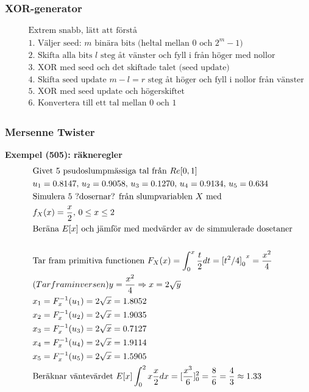\subsubsection{XOR-generator}
\begin{align*}
  &\quad  \text{Extrem snabb, lätt att förstå} \\
  &\quad  \text{1. Väljer seed: $m$ binära bits (heltal mellan $0$ och $2^m-1$)} \\
  &\quad  \text{2. Skifta alla bits $l$ steg åt vänster och fyll i från höger med nollor} \\
  &\quad  \text{3. XOR med seed och det skiftade talet (seed update)} \\
  &\quad  \text{4. Skifta seed update $m-l=r$ steg åt höger och fyll i nollor från vänster} \\
  &\quad  \text{5. XOR med seed update och högerskiftet} \\
  &\quad  \text{6. Konvertera till ett tal mellan $0$ och $1$} \\
\end{align*}

\subsubsection{Mersenne Twister}
\noindent\textbf{Exempel (505): räkneregler}
\begin{align*}
  &\quad  \text{Givet $5$ psudoslumpmässiga tal från $Re[0,1]$} \\
  &\quad  u_1=0.8147, \, u_2=0.9058, \, u_3=0.1270, \, u_4=0.9134, \, u_5=0.634 \\
  &\quad  \text{Simulera $5$ ?dosernar? från slumpvariablen $X$ med }\\
  &\quad  f_X(x)=\frac{x}{2}, \, 0 \leq x \leq 2 \\
  &\quad  \text{Beräna $E[x]$ och jämför med medvärder av de simmulerade dosetaner}\\
  &\quad  \\
  &\quad  \text{Tar fram primitiva functionen } F_X(x)=\int_0^x \frac{t}{2}dt = {{[t^2/4]}_0}^x=\frac{x^2}{4} \\
  &\quad  \text(Tar fram inversen ) y=\frac{x^2}{4} \Rightarrow x=2\sqrt{y} \\
  &\quad  x_1=F_x^{-1}(u_1) = 2\sqrt{x} = 1.8052 \\
  &\quad  x_2=F_x^{-1}(u_2) = 2\sqrt{x} = 1.9035 \\
  &\quad  x_3=F_x^{-1}(u_3) = 2\sqrt{x} = 0.7127 \\
  &\quad  x_4=F_x^{-1}(u_4) = 2\sqrt{x} = 1.9114 \\
  &\quad  x_5=F_x^{-1}(u_5) = 2\sqrt{x} = 1.5905 \\
  &\quad  \text{Beräknar väntevärdet } E[x] \int_0^2x\frac{x}{2}dx=[\frac{x^3}{6}]_0^2 =
  \frac{8}{6} = \frac{4}{3} \approx 1.33 \\
\end{align*}

